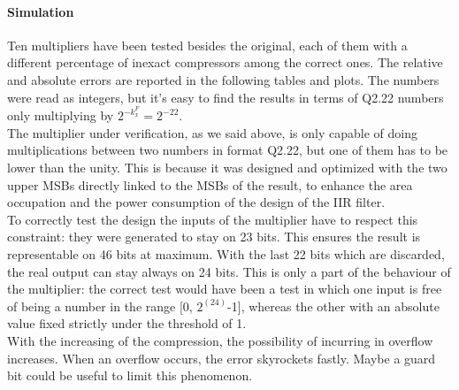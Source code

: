 \documentclass[a4paper]{article}
\begin{document}
	\paragraph*{Simulation} Ten multipliers have been tested besides the original, each of them with a different percentage of inexact compressors among the correct ones. The relative and absolute errors are reported in the following tables and plots. The numbers were read as integers, but it's easy to find the results in terms of Q2.22 numbers only multiplying by $2^{-k_x^{F}} = 2^{-22}$.\\
	The multiplier under verification, as we said above, is only capable of doing multiplications between two numbers in format Q2.22, but one of them has to be lower than the unity. This is because it was designed and optimized with the two upper MSBs directly linked to the MSBs of the result, to enhance the area occupation and the power consumption of the design of the IIR filter.\\
	To correctly test the design the inputs of the multiplier have to respect this constraint: they were generated to stay on 23 bits. This ensures the result is representable on 46 bits at maximum. With the last 22 bits which are discarded, the real output can stay always on 24 bits. This is only a part of the behaviour of the multiplier: the correct test would have been a test in which one input is free of being a number in the range [0, $2^(24)$-1], whereas the other with an absolute value fixed strictly under the threshold of 1.\\
	With the increasing of the compression, the possibility of incurring in overflow increases. When an overflow occurs, the error skyrockets fastly. Maybe a guard bit could be useful to limit this phenomenon.
\end{document}

